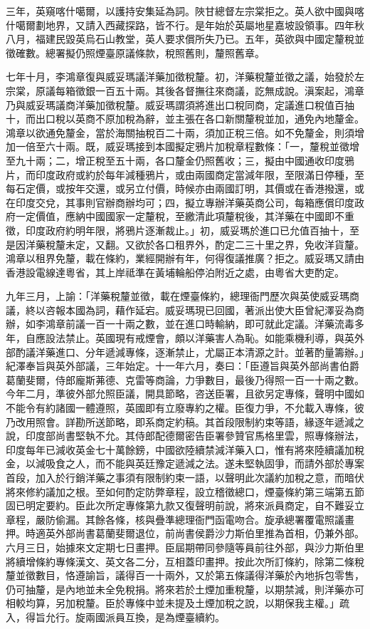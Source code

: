 \begin{pinyinscope}
三年，英窺喀什噶爾，以護持安集延為詞。陜甘總督左宗棠拒之。英人欲中國與喀什噶爾劃地界，又請入西藏探路，皆不行。是年始於英屬地星嘉坡設領事。四年秋八月，福建民毀英烏石山教堂，英人要求償所失乃已。五年，英欲與中國定釐稅並徵確數。總署擬仍照煙臺原議條款，稅照舊則，釐照舊章。

七年十月，李鴻章復與威妥瑪議洋藥加徵稅釐。初，洋藥稅釐並徵之議，始發於左宗棠，原議每箱徵銀一百五十兩。其後各督撫往來商議，訖無成說。滇案起，鴻章乃與威妥瑪議商洋藥加徵稅釐。威妥瑪謂須將進出口稅同商，定議進口稅值百抽十，而出口稅以英商不原加稅為辭，並主張在各口新關釐稅並加，通免內地釐金。鴻章以欲通免釐金，當於海關抽稅百二十兩，須加正稅三倍。如不免釐金，則須增加一倍至六十兩。既，威妥瑪接到本國擬定鴉片加稅章程數條：「一，釐稅並徵增至九十兩；二，增正稅至五十兩，各口釐金仍照舊收；三，擬由中國通收印度鴉片，而印度政府或約於每年減種鴉片，或由兩國商定當減年限，至限滿日停種，至每石定價，或按年交還，或另立付價，時候亦由兩國訂明，其價或在香港撥還，或在印度交兌，其事則官辦商辦均可；四，擬立專辦洋藥英商公司，每箱應償印度政府一定價值，應納中國國家一定釐稅，至繳清此項釐稅後，其洋藥在中國即不重徵，印度政府約明年限，將鴉片逐漸裁止。」初，威妥瑪於進口已允值百抽十，至是因洋藥稅釐未定，又翻。又欲於各口租界外，酌定二三十里之界，免收洋貨釐。鴻章以租界免釐，載在條約，業經開辦有年，何得復議推廣？拒之。威妥瑪又請由香港設電線達粵省，其上岸祗準在黃埔輪船停泊附近之處，由粵省大吏酌定。

九年三月，上諭：「洋藥稅釐並徵，載在煙臺條約，總理衙門歷次與英使威妥瑪商議，終以咨報本國為詞，藉作延宕。威妥瑪現已回國，著派出使大臣曾紀澤妥為商辦，如李鴻章前議一百一十兩之數，並在進口時輸納，即可就此定議。洋藥流毒多年，自應設法禁止。英國現有戒煙會，頗以洋藥害人為恥。如能乘機利導，與英外部酌議洋藥進口、分年遞減專條，逐漸禁止，尤屬正本清源之計。並著酌量籌辦。」紀澤奉旨與英外部議，三年始定。十一年六月，奏曰：「臣遵旨與英外部尚書伯爵葛蘭斐爾，侍郎龐斯茀德、克雷等商論，力爭數目，最後乃得照一百一十兩之數。今年二月，準彼外部允照臣議，開具節略，咨送臣署，且欲另定專條，聲明中國如不能令有約諸國一體遵照，英國即有立廢專約之權。臣復力爭，不允載入專條，彼乃改用照會。詳勘所送節略，即系商定約稿。其首段限制約束等語，緣逐年遞減之說，印度部尚書堅執不允。其侍郎配德爾密告臣署參贊官馬格里雲，照專條辦法，印度每年已減收英金七十萬餘鎊，中國欲陸續禁減洋藥入口，惟有將來陸續議加稅金，以減吸食之人，而不能與英廷豫定遞減之法。遂未堅執固爭，而請外部於專案首段，加入於行銷洋藥之事須有限制約束一語，以聲明此次議約加稅之意，而暗伏將來修約議加之根。至如何酌定防弊章程，設立稽徵總口，煙臺條約第三端第五節固已明定要約。臣此次所定專條第九款又復聲明前說，將來派員商定，自不難妥立章程，嚴防偷漏。其餘各條，核與疊準總理衙門函電吻合。旋承總署覆電照議畫押。時適英外部尚書葛蘭斐爾退位，前尚書侯爵沙力斯伯里推為首相，仍兼外部。六月三日，始據來文定期七日畫押。臣屆期帶同參隨等員前往外部，與沙力斯伯里將續增條約專條漢文、英文各二分，互相蓋印畫押。按此次所訂條約，除第二條稅釐並徵數目，恪遵諭旨，議得百一十兩外，又於第五條議得洋藥於內地拆包零售，仍可抽釐，是內地並未全免稅捐。將來若於土煙加重稅釐，以期禁減，則洋藥亦可相較均算，另加稅釐。臣於專條中並未提及土煙加稅之說，以期保我主權。」疏入，得旨允行。旋兩國派員互換，是為煙臺續約。


\end{pinyinscope}
